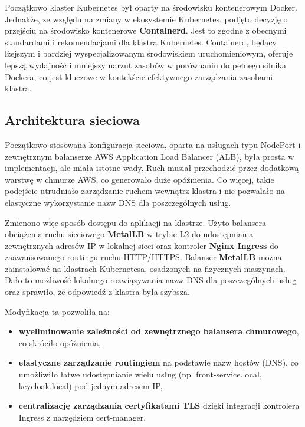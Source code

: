 Początkowo klaster Kubernetes był oparty na środowisku kontenerowym Docker. Jednakże, ze względu na zmiany w ekosystemie Kubernetes, podjęto decyzję o przejściu na środowisko kontenerowe \textbf{Containerd}. Jest to zgodne z obecnymi standardami i rekomendacjami dla klastra Kubernetes. Containerd, będący lżejszym i bardziej wyspecjalizowanym środowiskiem uruchomieniowym, oferuje lepszą wydajność i mniejszy narzut zasobów w porównaniu do pełnego silnika Dockera, co jest kluczowe w kontekście efektywnego zarządzania zasobami klastra.

\subsection{Architektura sieciowa}

Początkowo stosowana konfiguracja sieciowa, oparta na usługach typu NodePort i zewnętrznym balanserze AWS Application Load Balancer (ALB), była prosta w implementacji, ale miała istotne wady. Ruch musiał przechodzić przez dodatkową warstwę w chmurze AWS, co generowało duże opóźnienia. Co więcej, takie podejście utrudniało zarządzanie ruchem wewnątrz klastra i nie pozwalało na elastyczne wykorzystanie nazw DNS dla poszczególnych usług.

Zmienono więc sposób dostępu do aplikacji na klastrze. Użyto balansera obciążenia ruchu sieciowego \textbf{MetalLB} w trybie L2 do udostępniania zewnętrznych adresów IP w lokalnej sieci oraz kontroler \textbf{Nginx Ingress} do zaawansowanego routingu ruchu HTTP/HTTPS. Balanser \textbf{MetalLB} można zainstalować na klastrach Kubernetesa, osadzonych na fizycznych maszynach. Dało to możliwość lokalnego rozwiązywania nazw DNS dla poszczególnych usług oraz sprawiło, że odpowiedź z klastra była szybsza.

Modyfikacja ta pozwoliła na:
\begin{itemize}
    \item \textbf{wyeliminowanie zależności od zewnętrznego balansera chmurowego}, co skróciło opóźnienia,
    \item \textbf{elastyczne zarządzanie routingiem} na podstawie nazw hostów (DNS), co umożliwiło łatwe udostępnianie wielu usług (np. front-service.local, keycloak.local) pod jednym adresem IP,
    \item \textbf{centralizację zarządzania certyfikatami TLS} dzięki integracji kontrolera Ingress z narzędziem cert-manager.
\end{itemize}
